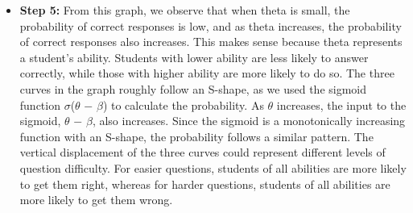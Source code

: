 \documentclass[letterpaper]{article}
\begin{document}


\begin{itemize}[resume*=listWWNumii]
\item \textbf{Step 5:} From this graph, we observe that when theta is small, the probability of correct responses is
low, and as theta increases, the probability of correct responses also increases. This makes sense because theta
represents a student's ability. Students with lower ability are less likely to answer correctly, while those with
higher ability are more likely to do so. The three curves in the graph roughly follow an S-shape, as we used the
sigmoid function $\sigma $($\theta $ $-$ $\beta $) to calculate the probability. As $\theta $ increases, the input to
the sigmoid, $\theta $ $-$ $\beta $, also increases. Since the sigmoid is a monotonically increasing function with an
S-shape, the probability follows a similar pattern. The vertical displacement of the three curves could represent
different levels of question difficulty. For easier questions, students of all abilities are more likely to get them
right, whereas for harder questions, students of all abilities are more likely to get them wrong.
\end{itemize}

\bigskip


\bigskip
\end{document}
